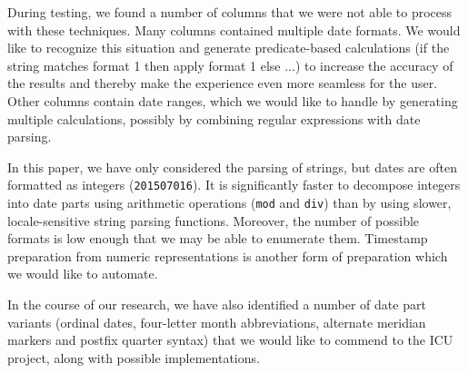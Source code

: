 During testing, we found a number of columns that we were not able to process with these techniques. Many columns contained multiple date formats. We would like to recognize this situation and generate predicate-based calculations (\eg if the string matches format 1 then apply format 1 else ...) to increase the accuracy of the results and thereby make the experience even more seamless for the user. Other columns contain date ranges, which we would like to handle by generating multiple calculations, possibly by combining regular expressions with date parsing.

In this paper, we have only considered the parsing of strings, but dates are often formatted as integers (\eg \texttt{201507016}). It is significantly faster to decompose integers into date parts using arithmetic operations (\eg \texttt{mod} and \texttt{div}) than by using slower, locale-sensitive string parsing functions. Moreover, the number of possible formats is low enough that we may be able to enumerate them. Timestamp preparation from numeric representations is another form of preparation which we would like to automate.

In the course of our research, we have also identified a number of date part variants (\eg ordinal dates, four-letter month abbreviations, alternate meridian markers and postfix quarter syntax) that we would like to commend to the ICU project, along with possible implementations.
